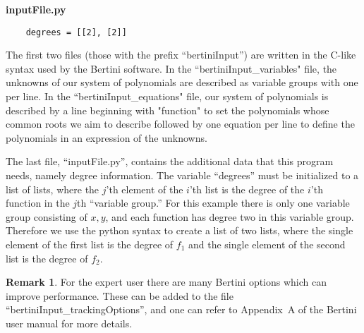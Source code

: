 \documentclass[12pt]{article}
\theoremstyle{definition}
\newtheorem{remark}{Remark}[section]
\begin{document}
\noindent \textbf{inputFile.py}

\begin{leftbar}
\vspace{-10pt} 
\begin{verbatim}
    degrees = [[2], [2]]
\end{verbatim}\vspace{-10pt} 
\end{leftbar}

The first two files (those with the prefix ``bertiniInput'') are 
written in the C-like syntax used by the Bertini software. 
In the ``bertiniInput\_variables" file, the unknowns of our system of polynomials are described as variable groups with one per line. 
In the ``bertiniInput\_equations" file, our system of polynomials is described 
by a line beginning with  "function" to set the polynomials whose common roots we aim to describe followed by one equation per line to define the polynomials in an expression of the unknowns. 

The last 
file, ``inputFile.py'', contains the additional data that this 
program needs, namely degree information. 
The variable ``degrees'' must be initialized to a list of lists, where 
the $j$'th element of the $i$'th list is the degree of the $i$'th 
function in the $j$th ``variable group.'' For this example there is only 
one variable group consisting of $x,y$, and each function has degree two 
in this variable group. Therefore we use the python syntax
%
to create a list of two lists, where the single element of the first 
list is the degree of $f_1$ and the single element of the second list is 
the degree of $f_2$.


\begin{remark}
For the expert user there are many Bertini options which can 
improve performance. These can be added 
to the file ``bertiniInput\_trackingOptions'', and one can refer to Appendix~A of the  Bertini user manual for more details. 
\end{remark}
\end{document}
